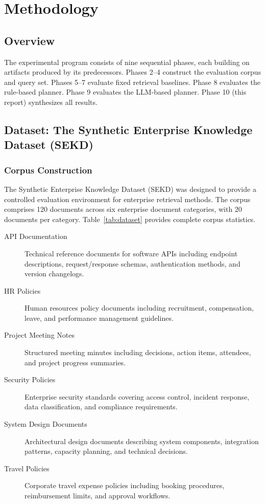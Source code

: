 \chapter{Methodology}
\label{chap:methodology}

\section{Overview}
\label{sec:method_overview}

The experimental program consists of nine sequential phases, each building on artifacts produced by its predecessors. Phases 2--4 construct the evaluation corpus and query set. Phases 5--7 evaluate fixed retrieval baselines. Phase 8 evaluates the rule-based planner. Phase 9 evaluates the LLM-based planner. Phase 10 (this report) synthesizes all results.

\section{Dataset: The Synthetic Enterprise Knowledge Dataset (SEKD)}
\label{sec:method_dataset}

\subsection{Corpus Construction}

The Synthetic Enterprise Knowledge Dataset (SEKD) was designed to provide a controlled evaluation environment for enterprise retrieval methods. The corpus comprises 120 documents across six enterprise document categories, with 20 documents per category. Table~\ref{tab:dataset} provides complete corpus statistics.

\begin{description}
    \item[API Documentation] Technical reference documents for software APIs including endpoint descriptions, request/response schemas, authentication methods, and version changelogs.
    \item[HR Policies] Human resources policy documents including recruitment, compensation, leave, and performance management guidelines.
    \item[Project Meeting Notes] Structured meeting minutes including decisions, action items, attendees, and project progress summaries.
    \item[Security Policies] Enterprise security standards covering access control, incident response, data classification, and compliance requirements.
    \item[System Design Documents] Architectural design documents describing system components, integration patterns, capacity planning, and technical decisions.
    \item[Travel Policies] Corporate travel expense policies including booking procedures, reimbursement limits, and approval workflows.
\end{description}

